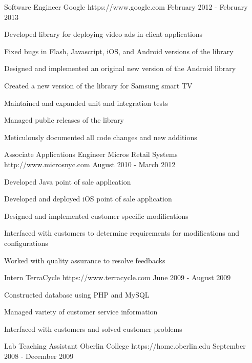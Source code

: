 \documentclass[11pt, a4paper]{awesome-cv}
\begin{document}
\begin{cventries}
{\begin{cvitems}
      \end{cvitems}
    }
    \cventry
    {Software Engineer}
    {Google}
    {https://www.google.com}
    {February 2012 - February 2013}
    {
      \begin{cvitems}
        \item {Developed library for deploying video ads in client applications}\item {Fixed bugs in Flash, Javascript, iOS, and Android versions of the library}\item {Designed and implemented an original new version of the Android library}\item {Created a new version of the library for Samsung smart TV}\item {Maintained and expanded unit and integration tests}\item {Managed public releases of the library}\item {Meticulously documented all code changes and new additions}
      \end{cvitems}
    }
    \cventry
    {Associate Applications Engineer}
    {Micros Retail Systems}
    {http://www.microsnyc.com}
    {August 2010 - March 2012}
    {
      \begin{cvitems}
        \item {Developed Java point of sale application}\item {Developed and deployed iOS point of sale application}\item {Designed and implemented customer specific modifications}\item {Interfaced with customers to determine requirements for modifications and configurations}\item {Worked with quality assurance to resolve feedbacks}
      \end{cvitems}
    }
    \cventry
    {Intern}
    {TerraCycle}
    {https://www.terracycle.com}
    {June 2009 - August 2009}
    {
      \begin{cvitems}
        \item {Constructed database using PHP and MySQL}\item {Managed variety of customer service information}\item {Interfaced with customers and solved customer problems}
      \end{cvitems}
    }
    \cventry
    {Lab Teaching Assistant}
    {Oberlin College}
    {https://home.oberlin.edu}
    {September 2008 - December 2009}
    {
      \begin{cvitems}

\end{cvitems}}
\end{cventries}
\end{document}
